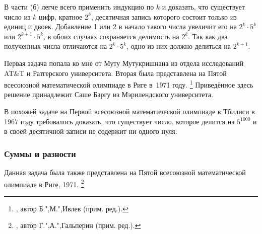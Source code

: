 \documentclass[twoside]{book}
\begin{document}

В части (б) легче всего применить индукцию по $k$
и доказать, что существует число из $k$ цифр, кратное $2^k$, десятичная запись которого состоит только из единиц и двоек.
Добавление 1 или 2 в начало такого числа увеличит его на $2^k\cdot 5^k$ или $2^{k+1}\cdot 5^k$, в обоих случаях сохраняется делимость на $2^k$.
Так как два полученных числа отличаются на $2^k\cdot 5^k$, одно из них должно делиться на $2^{k+1}$.
\heart

Первая задача попала ко мне от Муту Мутукришнана %
из отдела исследований AT\&T и Ратгерского университета.
Вторая была представлена на Пятой всесоюзной математической олимпиаде в Риге в~1971 году.%
\footnote{\cite[№144]{ВсМО}, автор  Б.",М.",Ивлев (прим. ред.).}
Приведённое здесь решение принадлежит Саше Баргу %
из Мэрилендского университета.


В похожей задаче на Первой всесоюзной математической олимпиаде в Тбилиси в 1967 году требовалось доказать, что существует число, которое делится на $5^{1000}$ и в своей десятичной записи не содержит ни одного нуля.
\heart

\subsubsection*{Суммы и разности}%

Данная задача была также представлена на Пятой всесоюзной математической олимпиаде в Риге, 1971.%
\footnote{\cite[№153]{ВсМО}, автор  Г.",А.",Гальперин (прим. ред.).}


\end{document}
